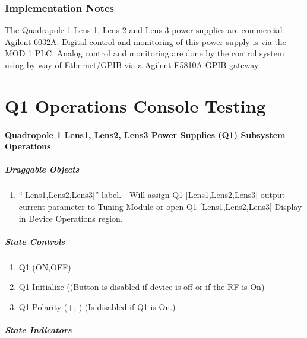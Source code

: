 \documentclass[11pt]{book}		%
\begin{document}
\subsection{Implementation Notes} \label{sect:cyc-equip-ctl-beamline-sm23a-implementation}

The Quadrapole 1 Lens 1, Lens 2 and Lens 3 power supplies are commercial Agilent 6032A.  Digital control and monitoring of this power supply is via the MOD 1 PLC.  Analog control and monitoring are done by the control system using by way of Ethernet/GPIB via a Agilent E5810A GPIB gateway.




\chapter{Q1 Operations Console Testing}

\subsubsection{Quadropole 1 Lens1, Lens2, Lens3 Power Supplies (Q1) Subsystem Operations}\label{sect:cyc-op-interface-ops-terminal-subsys-ops-mainline-q1}

\paragraph{Draggable Objects}

\begin{enumerate}
 \item ``[Lens1,Lens2,Lens3]'' label. - Will assign Q1 [Lens1,Lens2,Lens3] output current parameter to Tuning Module or open Q1 [Lens1,Lens2,Lens3] Display in Device Operations region.
\end{enumerate}

\paragraph{State Controls}

\begin{enumerate}
 \item Q1 (ON,OFF)
 \item Q1 Initialize ((Button is disabled if device is off or if the RF is On)
 \item Q1 Polarity (+,-) (Is disabled if Q1 is On.)
\end{enumerate}

\paragraph{State Indicators}
\end{document}
